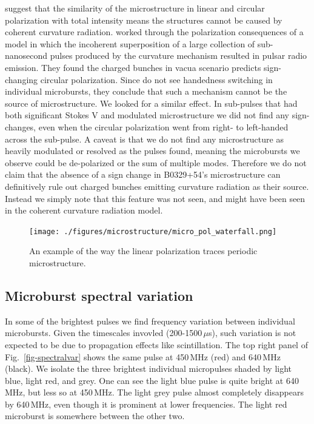 \citet{2015ApJ...806..236M} suggest that the similarity of 
the microstructure in 
linear and circular polarization with total intensity 
means the structures cannot be 
caused by coherent curvature radiation. 
\citet{1990A&A...234..269G} worked through the 
polarization consequences of a model 
in which the incoherent superposition of a large 
collection of sub-nanosecond pulses produced 
by the curvature mechanism resulted in pulsar radio emission.
They found the charged bunches in vacua scenario predicts
sign-changing circular polarization. Since 
\citet{2015ApJ...806..236M} do not see 
handedness switching in individual microbursts, they conclude 
that such a mechanism cannot be the source of microstructure.  
We looked for a similar effect. In sub-pulses that had both significant 
Stokes V and modulated microstructure we did not find any sign-changes, 
even when the circular polarization went from right- to left-handed
across the sub-pulse. A caveat is that we do not find any 
microstructure as heavily modulated or resolved as the pulses 
\citet{2015ApJ...806..236M} found, meaning the microbursts 
we observe could be de-polarized or the sum of multiple 
modes. Therefore we do not claim that the 
absence of a sign change in B0329+54's microstructure 
can definitively rule out charged bunches emitting 
curvature radiation as their source. Instead we simply note 
that this feature was not seen, and might have been seen 
in the coherent curvature radiation model.


\begin{figure}[!h]
\vspace{-0.1cm}
\begin{center}
\texttt{[image: ./figures/microstructure/micro\_pol\_waterfall.png]}
\caption{An example of the way the linear polarization 
     traces periodic microstructure.}
\label{fig-polwaterfall}
\end{center}
\end{figure}

\subsection{Microburst spectral variation}

In some of the brightest pulses we find frequency 
variation between individual microbursts. Given 
the timescales invovled (200-1500\,$\mu$s), such 
variation is not expected to be due to propagation 
effects like scintillation. The top right panel of 
Fig.~\ref{fig-spectralvar} shows the same pulse at 
450\,MHz (red) and 640\,MHz (black). We isolate the
three brightest individual micropulses shaded by 
light blue, light red, and grey. One can see the 
light blue pulse is quite bright at 640\,MHz, 
but less so at 450\,MHz. The light grey pulse almost 
completely disappears by 640\,MHz, even though 
it is prominent at lower frequencies. The light 
red microburst is somewhere between the other two.

